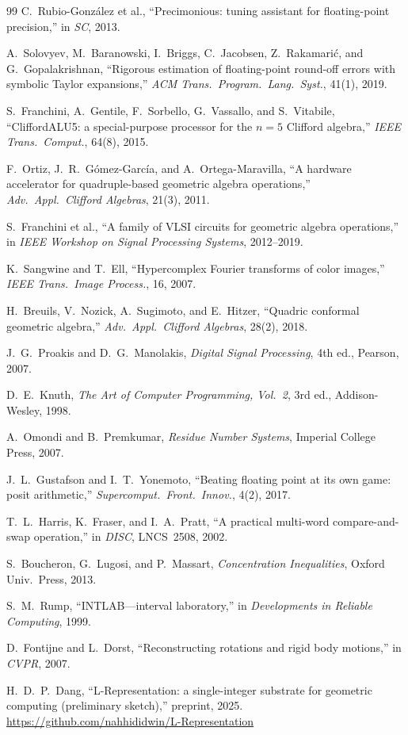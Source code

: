 \documentclass[11pt,a4paper]{article}
\theoremstyle{definition}
\theoremstyle{plain}
\theoremstyle{remark}
\begin{document}
\begin{thebibliography}{99}
C.~Rubio-González et al.,
``Precimonious: tuning assistant for floating-point precision,''
in \emph{SC}, 2013.

A.~Solovyev, M.~Baranowski, I.~Briggs, C.~Jacobsen, Z.~Rakamari\'{c}, and G.~Gopalakrishnan,
``Rigorous estimation of floating-point round-off errors with symbolic Taylor expansions,''
\emph{ACM Trans.\ Program.\ Lang.\ Syst.}, 41(1), 2019.

S.~Franchini, A.~Gentile, F.~Sorbello, G.~Vassallo, and S.~Vitabile,
``CliffordALU5: a special-purpose processor for the $n=5$ Clifford algebra,''
\emph{IEEE Trans.\ Comput.}, 64(8), 2015.

F.~Ortiz, J.~R.~Gómez-García, and A.~Ortega-Maravilla,
``A hardware accelerator for quadruple-based geometric algebra operations,''
\emph{Adv.\ Appl.\ Clifford Algebras}, 21(3), 2011.

S.~Franchini et al.,
``A family of VLSI circuits for geometric algebra operations,''
in \emph{IEEE Workshop on Signal Processing Systems}, 2012--2019.

K.~Sangwine and T.~Ell,
``Hypercomplex Fourier transforms of color images,''
\emph{IEEE Trans.\ Image Process.}, 16, 2007.

H.~Breuils, V.~Nozick, A.~Sugimoto, and E.~Hitzer,
``Quadric conformal geometric algebra,''
\emph{Adv.\ Appl.\ Clifford Algebras}, 28(2), 2018.

J.~G.~Proakis and D.~G.~Manolakis,
\emph{Digital Signal Processing}, 4th ed., Pearson, 2007.

D.~E.~Knuth,
\emph{The Art of Computer Programming, Vol.~2}, 3rd ed., Addison-Wesley, 1998.

A.~Omondi and B.~Premkumar,
\emph{Residue Number Systems}, Imperial College Press, 2007.

J.~L.~Gustafson and I.~T.~Yonemoto,
``Beating floating point at its own game: posit arithmetic,''
\emph{Supercomput.\ Front.\ Innov.}, 4(2), 2017.

T.~L.~Harris, K.~Fraser, and I.~A.~Pratt,
``A practical multi-word compare-and-swap operation,''
in \emph{DISC}, LNCS~2508, 2002.

S.~Boucheron, G.~Lugosi, and P.~Massart,
\emph{Concentration Inequalities}, Oxford Univ.\ Press, 2013.

S.~M.~Rump,
``INTLAB---interval laboratory,''
in \emph{Developments in Reliable Computing}, 1999.

D.~Fontijne and L.~Dorst,
``Reconstructing rotations and rigid body motions,''
in \emph{CVPR}, 2007.

H.~D.~P.~Dang,
``L-Representation: a single-integer substrate for geometric computing
(preliminary sketch),''
preprint, 2025.
\url{https://github.com/nahhididwin/L-Representation}

\end{thebibliography}
\end{document}
